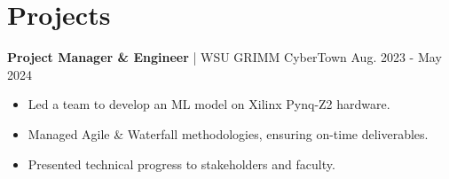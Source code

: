 \section{Projects}
\textbf{Project Manager \& Engineer} | WSU GRIMM CyberTown \hfill Aug. 2023 - May 2024
\begin{itemize}
    \item Led a team to develop an ML model on Xilinx Pynq-Z2 hardware.
    \item Managed Agile \& Waterfall methodologies, ensuring on-time deliverables.
    \item Presented technical progress to stakeholders and faculty.
\end{itemize}